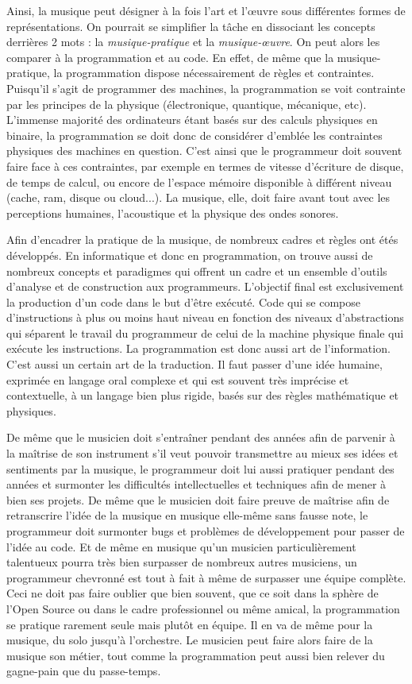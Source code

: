 \documentclass[12pt]{article} %
\begin{document}
Ainsi, la musique peut désigner à la fois l'art et l'œuvre sous différentes formes de représentations. On pourrait se simplifier la tâche en dissociant les concepts derrières 2 mots : la \textit{musique-pratique} et la \textit{musique-œuvre}. On peut alors les comparer à la programmation et au code. En effet, de même que la musique-pratique, la programmation dispose nécessairement de règles et contraintes. Puisqu'il s'agit de programmer des machines, la programmation se voit contrainte par les principes de la physique (électronique, quantique, mécanique, etc). L'immense majorité des ordinateurs étant basés sur des calculs physiques en binaire, la programmation se doit donc de considérer d'emblée les contraintes physiques des machines en question. C'est ainsi que le programmeur doit souvent faire face à ces contraintes, par exemple en termes de vitesse d'écriture de disque, de temps de calcul, ou encore de l'espace mémoire disponible à différent niveau (cache, \acrshort{ram}, disque ou cloud...). La musique, elle, doit faire avant tout avec les perceptions humaines, l'acoustique et la physique des ondes sonores. 

Afin d'encadrer la pratique de la musique, de nombreux cadres et règles ont étés développés. En informatique et donc en programmation, on trouve aussi de nombreux concepts et paradigmes qui offrent un cadre et un ensemble d'outils d'analyse et de construction aux programmeurs. L'objectif final est exclusivement la production d'un code dans le but d'être exécuté. Code qui se compose d'instructions à plus ou moins haut niveau en fonction des niveaux d'abstractions qui séparent le travail du programmeur de celui de la machine physique finale qui exécute les instructions. La programmation est donc aussi art de l'information. C'est aussi un certain art de la traduction. Il faut passer d'une idée humaine, exprimée en langage oral complexe et qui est souvent très imprécise et contextuelle, à un langage bien plus rigide, basés sur des règles mathématique et physiques. 

De même que le musicien doit s'entraîner pendant des années afin de parvenir à la maîtrise de son instrument s'il veut pouvoir transmettre au mieux ses idées et sentiments par la musique, le programmeur doit lui aussi pratiquer pendant des années et surmonter les difficultés intellectuelles et techniques afin de mener à bien ses projets. De même que le musicien doit faire preuve de maîtrise afin de retranscrire l'idée de la musique en musique elle-même sans fausse note, le programmeur doit surmonter bugs et problèmes de développement pour passer de l'idée au code. Et de même en musique qu'un musicien particulièrement talentueux pourra très bien surpasser de nombreux autres musiciens, un programmeur chevronné est tout à fait à même de surpasser une équipe complète. Ceci ne doit pas faire oublier que bien souvent, que ce soit dans la sphère de l'Open Source ou dans le cadre professionnel ou même amical, la programmation se pratique rarement seule mais plutôt en équipe. Il en va de même pour la musique, du solo jusqu'à l'orchestre. Le musicien peut faire alors faire de la musique son métier, tout comme la programmation peut aussi bien relever du gagne-pain que du passe-temps. 
\end{document}
